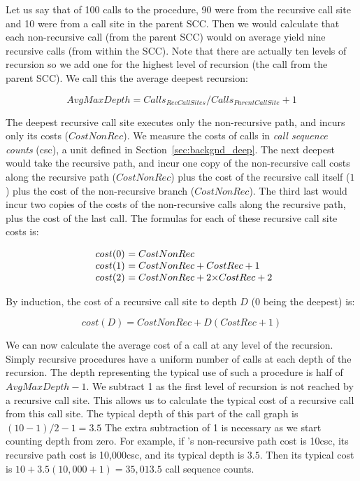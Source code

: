 Let us say that of 100 calls to the procedure,
90 were from the recursive call site
and 10 were from a call site in the parent SCC.
Then we would calculate
that each non-recursive call
(from the parent SCC)
would on average yield nine recursive calls
(from within the SCC).
Note that there are actually ten levels of recursion so we add one for the
highest level of recursion (the call from the parent SCC).
We call this the average deepest recursion:

\begin{equation*}
AvgMaxDepth = Calls_{RecCallSites} / Calls_{ParentCallSite} + 1
\end{equation*}

The deepest recursive call site executes only the non-recursive path,
and incurs only its costs ($CostNonRec$).
We measure the costs of calls in \emph{call sequence counts} (csc),
a unit defined in Section~\ref{sec:backgnd_deep}.
The next deepest would take the recursive path,
and incur one copy of the non-recursive call costs along the recursive path
($CostNonRec$)
plus the cost of the recursive call itself ($1$)
plus the cost of the non-recursive branch ($CostNonRec$).
The third last would incur two copies of the costs
of the non-recursive calls along the recursive path,
plus the cost of the last call.
The formulas for each of these recursive call site costs is:

\[
\begin{array}{r @{}l @{}l}
cost(0)~&= CostNonRec \\
cost(1)~&= CostNonRec + CostRec + 1 \\
cost(2)~&= CostNonRec + 2{\times}CostRec + 2
\end{array}
\]

\noindent
By induction,
the cost of a recursive call site to depth $D$ (0 being the deepest)
is:

\begin{equation*}
cost(D) = CostNonRec + D(CostRec + 1)
\end{equation*}

We can now calculate the average cost of a call at any level of the
recursion.
Simply recursive procedures have a uniform number of calls at each depth of
the recursion.
The depth representing the typical use of such a procedure is half of
$AvgMaxDepth - 1$.
We subtract 1 as the first level of recursion is not reached by a recursive
call site.
This allows us to calculate the typical cost of a recursive call from this
call site.
The typical depth of this part of the call graph is $(10 - 1)/2 - 1 = 3.5$
The extra subtraction of 1 is necessary as we start counting depth from
zero.
For example, if \mapfoldl's non-recursive path cost is 10csc,
its recursive path cost is 10,000csc,
and its typical depth is $3.5$.
Then its typical cost is $10 + 3.5(10,000 + 1) = 35,013.5$ call sequence counts.

